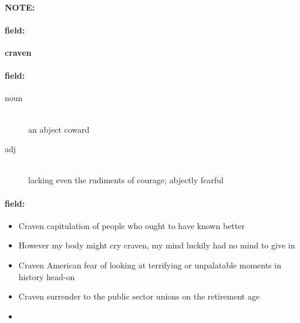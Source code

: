 \documentclass[12pt]{article}
\newenvironment{note}{\paragraph{NOTE:}}{}
\newenvironment{field}{\paragraph{field:}}{}
\begin{document}
\begin{note}
\begin{field}
\textbf{\large craven}
\end{field}


\begin{field}
\begin{description}
\item[noun] \hfill \\ 
an abject coward

\item[adj] \hfill \\ 
lacking even the rudiments of courage; abjectly fearful

\end{description}
\end{field}

\begin{field}
\begin{itemize}
\item Craven capitulation of people who ought to have known better
\item However my body might cry craven, my mind luckily had no mind to give in
\item Craven American fear of looking at terrifying or unpalatable moments in history head-on
\item Craven surrender to the public sector unions on the retirement age
\item 
\end{itemize}
\end{field}
\end{note}
\end{document}
